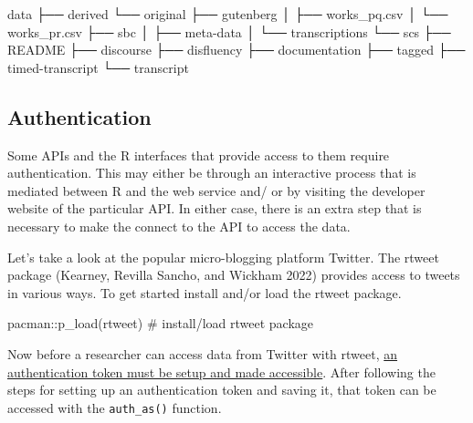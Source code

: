 \documentclass[
  letterpaper,
]{latex/krantz}
\newenvironment{Shaded}{\begin{snugshade}}{\end{snugshade}}
\newcommand{\CommentTok}[1]{\textcolor[rgb]{0.37,0.37,0.37}{#1}}
\newcommand{\ExtensionTok}[1]{\textcolor[rgb]{0.00,0.23,0.31}{#1}}
\newcommand{\FunctionTok}[1]{\textcolor[rgb]{0.28,0.35,0.67}{#1}}
\newcommand{\NormalTok}[1]{\textcolor[rgb]{0.00,0.23,0.31}{#1}}
\newcommand{\SpecialCharTok}[1]{\textcolor[rgb]{0.37,0.37,0.37}{#1}}
\begin{document}
\begin{Shaded}
\begin{Highlighting}[]
\ExtensionTok{data}
\ExtensionTok{├──}\NormalTok{ derived}
\ExtensionTok{└──}\NormalTok{ original}
    \ExtensionTok{├──}\NormalTok{ gutenberg}
    \ExtensionTok{│}\NormalTok{   ├── works\_pq.csv}
    \ExtensionTok{│}\NormalTok{   └── works\_pr.csv}
    \ExtensionTok{├──}\NormalTok{ sbc}
    \ExtensionTok{│}\NormalTok{   ├── meta{-}data}
    \ExtensionTok{│}\NormalTok{   └── transcriptions}
    \ExtensionTok{└──}\NormalTok{ scs}
        \ExtensionTok{├──}\NormalTok{ README}
        \ExtensionTok{├──}\NormalTok{ discourse}
        \ExtensionTok{├──}\NormalTok{ disfluency}
        \ExtensionTok{├──}\NormalTok{ documentation}
        \ExtensionTok{├──}\NormalTok{ tagged}
        \ExtensionTok{├──}\NormalTok{ timed{-}transcript}
        \ExtensionTok{└──}\NormalTok{ transcript}
\end{Highlighting}
\end{Shaded}

\hypertarget{authentication}{%
\subsection{Authentication}\label{authentication}}

Some APIs and the R interfaces that provide access to them require
authentication. This may either be through an interactive process that
is mediated between R and the web service and/ or by visiting the
developer website of the particular API. In either case, there is an
extra step that is necessary to make the connect to the API to access
the data.

Let's take a look at the popular micro-blogging platform Twitter. The
rtweet package (Kearney, Revilla Sancho, and Wickham 2022) provides
access to tweets in various ways. To get started install and/or load the
rtweet package.

\begin{Shaded}
\begin{Highlighting}[]
\NormalTok{pacman}\SpecialCharTok{::}\FunctionTok{p\_load}\NormalTok{(rtweet) }\CommentTok{\# install/load rtweet package}
\end{Highlighting}
\end{Shaded}

Now before a researcher can access data from Twitter with rtweet,
\href{https://docs.ropensci.org/rtweet/articles/auth.html}{an
authentication token must be setup and made accessible}. After following
the steps for setting up an authentication token and saving it, that
token can be accessed with the \texttt{auth\_as()} function.
\end{document}
